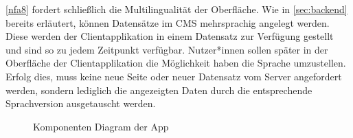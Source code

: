\ref{nfa8} fordert schließlich die Multilingualität der Oberfläche. Wie in \autoref{sec:backend} 
bereits erläutert, können Datensätze im CMS mehrsprachig angelegt werden. Diese werden der Clientapplikation
in einem Datensatz zur Verfügung gestellt und sind so zu jedem Zeitpunkt verfügbar. 
Nutzer*innen sollen später in der Oberfläche der Clientapplikation die Möglichkeit haben die Sprache
umzustellen. Erfolg dies, muss keine neue Seite oder neuer Datensatz vom Server angefordert werden, sondern lediglich
die angezeigten Daten durch die entsprechende Sprachversion ausgetauscht werden.\\

\begin{figure}
    \centering
    
    \caption{Komponenten Diagram der \shst{} App}
    \label{fig:ss-app-class-diagram}
\end{figure}

